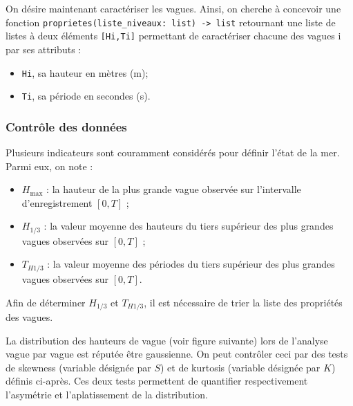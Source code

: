 On désire maintenant caractériser les vagues.
Ainsi, on cherche à concevoir une fonction \texttt{proprietes(liste\_niveaux: list) -> list} retournant une liste de
listes à deux éléments \texttt{[Hi,Ti]} permettant de caractériser chacune des vagues i par ses attributs :
\begin{itemize}
\item \texttt{Hi}, sa hauteur en mètres (m);
\item \texttt{Ti}, sa période en secondes (s).
\end{itemize}


\subsubsection*{Contrôle des données}
Plusieurs indicateurs sont couramment considérés pour définir l’état de la mer. Parmi eux, on
note :
\begin{itemize}
\item $H_{\text{max}}$ : la hauteur de la plus grande vague observée sur l’intervalle d’enregistrement $[0, T]$ ;
\item $H_{1/3}$ : la valeur moyenne des hauteurs du tiers supérieur des plus grandes vagues observées
sur $[0, T]$ ;
\item $T_{H1/3}$ : la valeur moyenne des périodes du tiers supérieur des plus grandes vagues observées
sur $[0, T]$.
\end{itemize}


Afin de déterminer $H_{1/3}$ et $T_{H1/3}$, il est nécessaire de trier la liste des propriétés des vagues. 




La distribution des hauteurs de vague (voir figure suivante) lors de l’analyse vague par vague est
réputée être gaussienne. On peut contrôler ceci par des tests de skewness (variable désignée par $S$)
et de kurtosis (variable désignée par $K$) définis ci-après. Ces deux tests permettent de quantifier
respectivement l’asymétrie et l’aplatissement de la distribution.

